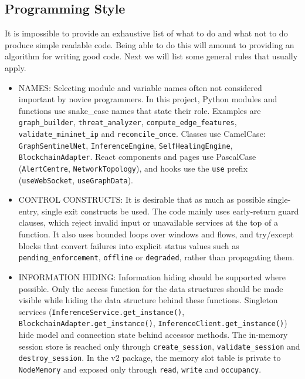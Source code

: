 \documentclass[12pt,a4paper]{report}
\begin{document}
\subsection{Programming Style}
It is impossible to provide an exhaustive list of what to do and what not to do produce simple readable code. Being able to do this will amount to providing an algorithm for writing good code. Next we will list some general rules that usually apply.
\begin{itemize}
\item NAMES:
Selecting module and variable names often not considered important by novice programmers. In this project, Python modules and functions use snake\_case names that state their role. Examples are \texttt{graph\_builder}, \texttt{threat\_analyzer}, \texttt{compute\_edge\_features}, \texttt{validate\_mininet\_ip} and \texttt{reconcile\_once}. Classes use CamelCase: \texttt{GraphSentinelNet}, \texttt{InferenceEngine}, \texttt{SelfHealingEngine}, \texttt{BlockchainAdapter}. React components and pages use PascalCase (\texttt{AlertCentre}, \texttt{NetworkTopology}), and hooks use the \texttt{use} prefix (\texttt{useWebSocket}, \texttt{useGraphData}).

\item CONTROL CONSTRUCTS:
It is desirable that as much as possible single-entry, single exit constructs be used. The code mainly uses early-return guard clauses, which reject invalid input or unavailable services at the top of a function. It also uses bounded loops over windows and flows, and try/except blocks that convert failures into explicit status values such as \texttt{pending\_enforcement}, \texttt{offline} or \texttt{degraded}, rather than propagating them.

\item  INFORMATION HIDING:
Information hiding should be supported where possible. Only the access function for the data structures should be made visible while hiding the data structure behind these functions. Singleton services (\texttt{InferenceService.get\_instance()}, \texttt{BlockchainAdapter.get\_instance()}, \texttt{InferenceClient.get\_instance()}) hide model and connection state behind accessor methods. The in-memory session store is reached only through \texttt{create\_session}, \texttt{validate\_session} and \texttt{destroy\_session}. In the v2 package, the memory slot table is private to \texttt{NodeMemory} and exposed only through \texttt{read}, \texttt{write} and \texttt{occupancy}.


\end{itemize}
\end{document}
